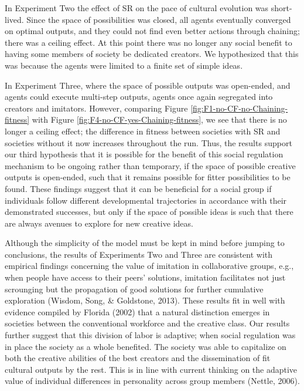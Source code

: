 \documentclass[a4paper,12pt,man,british]{apa6}
\begin{document}
In Experiment Two the effect of SR on the pace of cultural evolution was short-lived. Since the space of possibilities was closed, all agents eventually converged on optimal outputs, and they could not find even better actions through chaining; there was a ceiling effect. At this point there was no longer any social benefit to having some members of society be dedicated creators. We hypothesized that this was because the agents were limited to a finite set of simple ideas. 

In Experiment Three, where the space of possible outputs was open-ended, and agents could execute multi-step outputs, agents once again segregated into creators and imitators. However, comparing Figure \ref{fig:F1-no-CF-no-Chaining-fitness} with Figure \ref{fig:F4-no-CF-yes-Chaining-fitness}, we see that there is no longer a ceiling effect; the difference in fitness between societies with SR and societies without it now increases throughout the run. 
Thus, the results support our third hypothesis that it is possible for the benefit of this social regulation mechanism to be ongoing rather than temporary, if the space of possible creative outputs is open-ended, such that it remains possible for fitter possibilities to be found. 
These findings suggest that it can be beneficial for a social group if individuals follow different developmental trajectories in accordance with their demonstrated successes, but only if the space of possible ideas is such that there are always avenues to explore for new creative ideas.

Although the simplicity of the model must be kept in mind before jumping to conclusions, the results of Experiments Two and Three are consistent with empirical findings concerning the value of imitation in collaborative groups, e.g., when people have access to their peers' solutions, imitation facilitates not just scrounging but the propagation of good solutions for further cumulative exploration  (Wisdom, Song, \& Goldstone, 2013). These results fit in well with evidence compiled by Florida (2002) that a natural distinction emerges in societies between the conventional workforce and the creative class. Our results further suggest that this division of labor is adaptive; when social regulation was in place the society as a whole benefited. The society was able to capitalize on both the creative abilities of the best creators and the dissemination of fit cultural outputs by the rest. This is in line with current thinking on the adaptive value of individual differences in personality across group members (Nettle, 2006).
\end{document}
